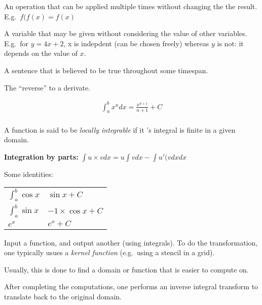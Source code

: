 \begin{definition}[Flow]
\begin{definition}[Idempotence]
    An operation that can be applied multiple times without changing the
    the result. E.g.\ $f(f(x) = f(x)$
\end{definition}

\begin{definition}
    A variable that may be given without considering the value of other
    variables. E.g.\ for $y = 4x + 2$, x is indepdent (can be chosen freely)
    whereas $y$ is not: it depends on the value of $x$.
\end{definition}

\begin{definition}[Invariant]
    A sentence that is believed to be true throughout some timespan.
\end{definition}

\begin{definition}[Integral]
    The ``reverse'' to a derivate. 

    \begin{align}
        \int_{a}^{b}x^{n} dx = \frac{x^{n+1}}{n+1} + C \\
    \end{align}

    A function is said to be \textit{locally integrable} if it 's integral is 
    finite in a given domain.

    \textbf{Integration by parts:} $\int{u \times v dx} = u\int{v dx} - \int{u\prime{(v dx}}dx $

    Some identities:
    \begin{longtable}{|l|l|}
        $\int_{a}^{b}\cos{x} $ & $\sin{x} + C $ \\
    $\int_{a}^{b}\sin{x}$ & $-1 \times \cos{x} + C $\\
    $e^{x}$ & $e^{x} + C $
    \end{longtable}

\end{definition}

\begin{definition}\label{inttrans}
    Input a function, and output another (using integrals).
    To do the transformation, one typically usues a \textit{kernel function} (e.g.\ 
    using a stencil in a grid).

    Usually, this is done to find a domain or function that is easier to compute
    on. 

    After completing the computations, one performs an inverse integral transform
    to translate back to the original domain.
\end{definition}


\end{definition}
